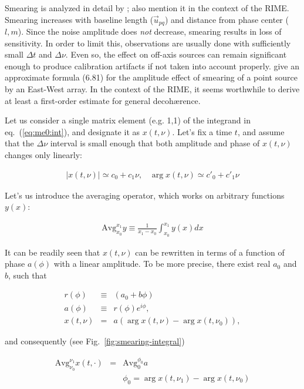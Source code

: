 \documentclass[]{aa}
\begin{document}
Smearing is analyzed in detail by \citet[Sect.~6.4]{tms}; \citet{ME1} also mention it in the context of the RIME. Smearing increases with baseline length ($\vec u_{pq}$) and distance from phase center ($l,m$). Since the noise amplitude does {\em not} decrease, smearing results in loss of sensitivity. In order to limit this, observations are usually done with sufficiently small $\Delta t$ and $\Delta\nu$. Even so, the effect on off-axis sources can remain significant enough to produce calibration artifacts if not taken into account properly. \citet{tms} give an approximate formula (6.81) for the amplitude effect of smearing of a point source by an East-West array. In the context of the RIME, it seems worthwhile to derive at least a first-order estimate for general decoh{\ae}rence.

Let us consider a single matrix element (e.g. 1,1) of the integrand in eq.~(\ref{eq:me0:int}), and designate it as $x(t,\nu)$. Let's fix a time $t$, and assume that the $\Delta\nu$ interval is small enough that both amplitude and phase of $x(t,\nu)$ changes only linearly:

\begin{eqnarray*}
|x(t,\nu)| \simeq c_0+c_1\nu, \;\;\;
\arg x(t,\nu) \simeq c'_0+c'_1\nu
\end{eqnarray*}

Let's us introduce the averaging operator, which works on arbitrary functions $y(x)$:

\begin{eqnarray*}
\mathrm{Avg}_{x_0}^{x_1}y \equiv \frac{1}{x_1-x_0} \int_{x_0}^{x_1} y(x)dx
\end{eqnarray*}

It can be readily seen that $x(t,\nu)$ can be rewritten in terms of a function of phase $a(\phi)$ with a linear amplitude. To be more precise, there exist real $a_0$ and $b$, such that

\begin{eqnarray*}
r(\phi) &\equiv& (a_0+b\phi) \\
a(\phi) &\equiv& r(\phi)e^{i\phi}, \\
x(t,\nu) &=& a(\arg x(t,\nu) - \arg x(t,\nu_0)),
\end{eqnarray*}

and consequently (see Fig.~\ref{fig:smearing-integral})

\begin{eqnarray*}
\mathrm{Avg}_{\nu_0}^{\nu_1}x(t,\cdot) & = & \mathrm{Avg}_0^{\phi_0} a \\
&& \phi_0 = \arg x(t,\nu_1) - \arg x(t,\nu_0)
\end{eqnarray*}
\end{document}
